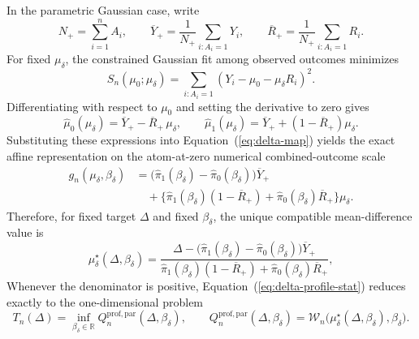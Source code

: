 \documentclass[11pt]{article}
\begin{document}
In the parametric Gaussian case, write
\[
  N_+ = \sum_{i = 1}^n A_i,
  \qquad
  \overline{Y}_+
  =
  \frac{1}{N_+}\sum_{i : A_i = 1} Y_i,
  \qquad
  \overline{R}_+
  =
  \frac{1}{N_+}\sum_{i : A_i = 1} R_i.
\]
For fixed $\mu_\delta$, the constrained Gaussian fit among observed outcomes minimizes
\[
  S_n(\mu_0;\mu_\delta)
  =
  \sum_{i : A_i = 1}
  \left(Y_i - \mu_0 - \mu_\delta R_i\right)^2.
\]
Differentiating with respect to $\mu_0$ and setting the derivative to zero gives
\[
  \widehat{\mu}_0(\mu_\delta)
  =
  \overline{Y}_+ - \overline{R}_+\,\mu_\delta,
  \qquad
  \widehat{\mu}_1(\mu_\delta)
  =
  \overline{Y}_+ + (1-\overline{R}_+)\mu_\delta.
\]
Substituting these expressions into Equation~(\ref{eq:delta-map}) yields the exact affine representation on the atom-at-zero numerical combined-outcome scale
\begin{align}
  g_n(\mu_\delta,\beta_\delta)
  &=
  \bigl(\widehat{\pi}_1(\beta_\delta) - \widehat{\pi}_0(\beta_\delta)\bigr)\overline{Y}_+\nonumber\\
  &\quad +
  \bigl\{\widehat{\pi}_1(\beta_\delta)(1-\overline{R}_+) + \widehat{\pi}_0(\beta_\delta)\overline{R}_+\bigr\}\mu_\delta.
  \label{eq:delta-parametric-affine}
\end{align}
Therefore, for fixed target $\Delta$ and fixed $\beta_\delta$, the unique compatible mean-difference value is
\begin{equation}
  \mu_\delta^{\star}(\Delta,\beta_\delta)
  =
  \frac{
    \Delta
    -
    \bigl(\widehat{\pi}_1(\beta_\delta) - \widehat{\pi}_0(\beta_\delta)\bigr)\overline{Y}_+
  }{
    \widehat{\pi}_1(\beta_\delta)(1-\overline{R}_+) + \widehat{\pi}_0(\beta_\delta)\overline{R}_+
  },
  \label{eq:delta-parametric-mudelta}
\end{equation}
Whenever the denominator is positive, Equation~(\ref{eq:delta-profile-stat}) reduces exactly to the one-dimensional problem
\begin{equation}
  T_n(\Delta)
  =
  \inf_{\beta_\delta \in \mathbb{R}}
  Q^{\mathrm{prof,par}}_n(\Delta,\beta_\delta),
  \qquad
  Q^{\mathrm{prof,par}}_n(\Delta,\beta_\delta)
  =
  \mathcal{W}_n\bigl(\mu_\delta^{\star}(\Delta,\beta_\delta),\beta_\delta\bigr).
  \label{eq:delta-profile-parametric-objective}
\end{equation}
\end{document}
